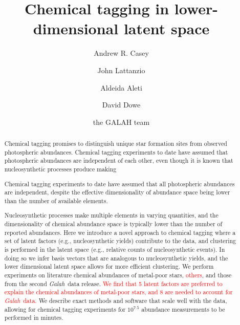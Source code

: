 \documentclass[twocolumn]{aastex62}
\newcommand{\project}[1]{\textsl{#1}}
\newcommand{\Galah}{\project{Galah}}
\newcommand{\todo}[1]{\textcolor{red}{#1}}
\begin{document}
\title{Chemical tagging in lower-dimensional latent space}


\author[0000-0003-0174-0564]{Andrew R. Casey}
			 
\author{John Lattanzio}

\author{Aldeida Aleti}

\author{David Dowe}
			 
\author{the GALAH team}


\begin{abstract}
Chemical tagging promises to distinguish unique star formation sites from 
observed photospheric abundances.
Chemical tagging experiments to date have assumed that photospheric
abundances are independent of each other, even though it is known that 
nucleosynthetic processes 
produce
making


Chemical tagging experiments to date have assumed that all photospheric
abundances are independent, despite the effective dimensionality of abundance
space being lower than the number of available elements.

Nucleosynthetic processes make multiple elements in varying quantities, and the
dimensionality of chemical abundance space is typically lower than the 
number of reported abundances. 
Here we introduce a novel approach to chemical tagging where a set of 
latent factors (e.g., nucleosynthetic yields) contribute to the
data, and clustering is performed in the latent space (e.g., relative counts of
nucleosynthetic events). In doing so we infer basis vectors that are analogous
to nucleosynthetic yields, and the lower dimensional latent space allows for
more efficient clustering. We perform experiments on literature chemical abundances
of metal-poor stars, \todo{others}, and 
those from the second \Galah\ data release. \todo{We find that 5 latent factors are
preferred to explain the chemical abundances of metal-poor stars, and 8 are
needed to account for \Galah\ data.}
We describe exact methods and software that scale well with the data,
allowing for chemical tagging experiments for $10^{7.5}$ abundance measurements
to be performed in minutes.
\end{abstract}
\end{document}
